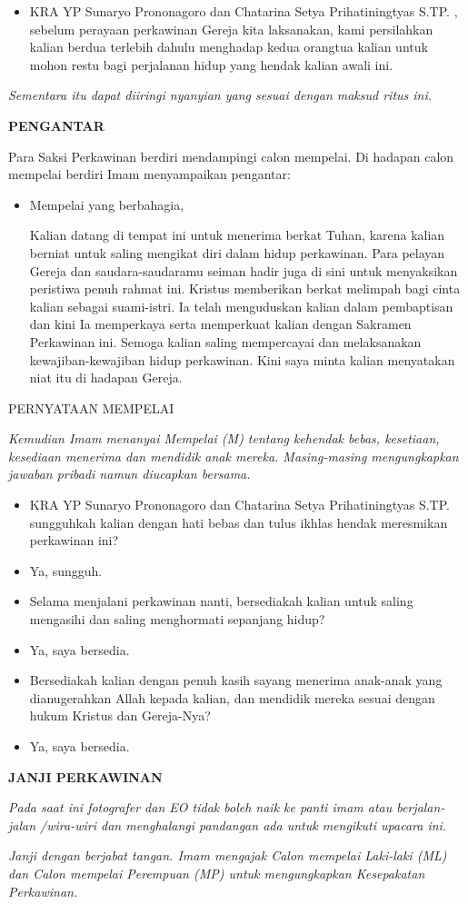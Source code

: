 \documentclass[a5paper,titlepage,11pt,openany]{scrbook}
\makeatletter
\newcommand{\subjudul}[1]{%
  {\parindent \z@ 
    \interlinepenalty\@M \large \bfseries #1\par\nobreak \vskip 10\p@ }}
\newcommand{\BI}[1]{\begin{itemize} \item[I:] #1 \end{itemize}}
\newcommand{\BPL}[1]{\begin{itemize} \item[Naryo:] #1 \end{itemize}}
\newcommand{\BPLW}[1]{\begin{itemize} \item[N+K:] #1 \end{itemize}}
\newcommand{\camantri}{Chatarina Setya Prihatiningtyas S.TP. }
\newcommand{\camantra}{KRA YP Sunaryo Prononagoro }
\makeatother
\begin{document}
\BI{\camantra dan \camantri, sebelum perayaan perkawinan Gereja kita laksanakan, kami persilahkan kalian berdua terlebih dahulu menghadap kedua orangtua kalian untuk mohon restu bagi perjalanan hidup yang hendak kalian awali ini.}

\textit{Sementara itu dapat diiringi nyanyian yang sesuai dengan maksud ritus ini.}

\subjudul{PENGANTAR}

Para Saksi Perkawinan berdiri mendampingi calon mempelai. Di hadapan calon mempelai berdiri Imam menyampaikan pengantar:


\BI{Mempelai yang berbahagia,

         Kalian datang di tempat ini untuk menerima berkat Tuhan, karena kalian berniat untuk saling mengikat diri dalam hidup perkawinan. Para pelayan Gereja dan saudara-saudaramu seiman hadir juga di sini untuk menyaksikan peristiwa penuh rahmat ini. Kristus memberikan berkat melimpah bagi cinta kalian sebagai suami-istri. Ia telah menguduskan kalian dalam pembaptisan dan kini Ia memperkaya serta memperkuat kalian dengan Sakramen Perkawinan ini. Semoga kalian saling mempercayai dan melaksanakan kewajiban-kewajiban hidup perkawinan. Kini saya minta kalian menyatakan niat itu di hadapan Gereja.}

PERNYATAAN MEMPELAI

\textit{Kemudian Imam menanyai Mempelai (M) tentang kehendak bebas, kesetiaan, kesediaan menerima dan mendidik anak mereka. Masing-masing mengungkapkan jawaban pribadi namun diucapkan bersama.          
}

\BI{\camantra dan \camantri sungguhkah kalian dengan hati bebas dan tulus ikhlas hendak meresmikan perkawinan ini?}
\BPLW{Ya, sungguh.}
\BI{Selama menjalani perkawinan nanti, bersediakah kalian untuk saling mengasihi dan saling menghormati sepanjang hidup?}
\BPL{Ya, saya bersedia.}
\BI{Bersediakah kalian dengan penuh kasih sayang menerima anak-anak yang dianugerahkan Allah kepada kalian, dan mendidik mereka sesuai dengan hukum Kristus dan Gereja-Nya?}
\BPLW{Ya, saya bersedia.}

\subjudul{JANJI PERKAWINAN}

\textit{Pada saat ini fotografer dan EO tidak boleh naik ke panti imam atau berjalan-jalan /wira-wiri dan menghalangi pandangan ada untuk mengikuti upacara ini.}

\textit{Janji dengan berjabat tangan. Imam mengajak Calon mempelai Laki-laki (ML) dan Calon mempelai Perempuan (MP) untuk mengungkapkan Kesepakatan Perkawinan.}
\end{document}
